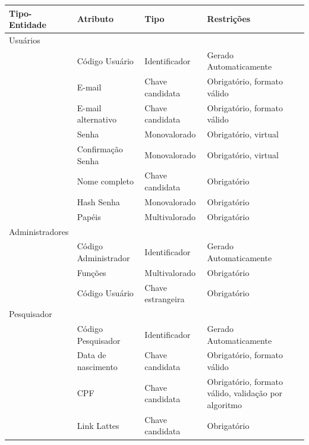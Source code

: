 \documentclass[11pt]{../../classes/ifscarticle}
\begin{document}
\begin{table}[h]
  \centering
  \vspace{0.5cm}
  \begin{tabular}{l|l|l|l|}
    Tipo-Entidade & Atributo & Tipo & Restrições \\ %
   
    \hline                               %
    Usuários \\ 
                  & Código Usuário      & Identificador     & Gerado Automaticamente      \\
                  & E-mail              & Chave candidata   & Obrigatório, formato válido \\
                  & E-mail alternativo  & Chave candidata   & Obrigatório, formato válido \\
                  & Senha               & Monovalorado      & Obrigatório, virtual        \\
                  & Confirmação Senha   & Monovalorado      & Obrigatório, virtual        \\
                  & Nome completo       & Chave candidata   & Obrigatório                 \\
                  & Hash Senha          & Monovalorado      & Obrigatório                 \\
                  & Papéis              & Multivalorado     & Obrigatório                 \\
    \hline
    Administradores \\
                  & Código Administrador & Identificador & Gerado Automaticamente \\
                  & Funções              & Multivalorado & Obrigatório            \\
                  & Código Usuário       & Chave estrangeira & Obrigatório        \\
    \hline
    Pesquisador \\
                  & Código Pesquisador  & Identificador     & Gerado Automaticamente                               \\
                  & Data de nascimento  & Chave candidata   & Obrigatório, formato válido                          \\
                  & CPF                 & Chave candidata   & Obrigatório, formato válido, validação por algoritmo \\
                  & Link Lattes         & Chave candidata   & Obrigatório                                          \\

\end{tabular}
\end{table}
\end{document}
